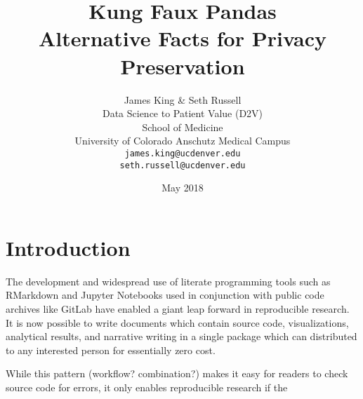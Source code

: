 \documentclass{article}
\title{%
  Kung Faux Pandas \\
  \large Alternative Facts for 
    Privacy Preservation}
\author{
  James King \& Seth Russell\\
  Data Science to Patient Value (D2V) \\
  School of Medicine \\
  University of Colorado Anschutz Medical Campus\\
  \texttt{james.king@ucdenver.edu} \\ 
  \texttt{seth.russell@ucdenver.edu} \\
  }
\date{May 2018}
\begin{document}


\maketitle

\begin{abstract}

\end{abstract}

\section{Introduction}

The development and widespread use of literate programming tools such as RMarkdown and Jupyter Notebooks used in conjunction with public code archives like GitLab have enabled a giant leap forward in reproducible research.  It is now possible to write documents which contain source code, visualizations, analytical results, and narrative writing in a single package which can distributed to any interested person for essentially zero cost.

While this pattern (workflow? combination?) makes it easy for readers to check source code for errors, it only enables reproducible research if the 










\end{document}
